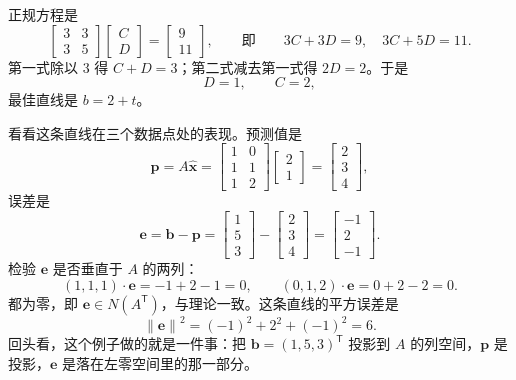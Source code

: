 \documentclass[UTF8,a4paper,12pt]{ctexart}
\numberwithin{equation}{section}
\newcommand{\norm}[1]{\left\lVert #1 \right\rVert}
\newcommand{\trans}{^{\mathsf T}}
\begin{document}
	正规方程是
	\begin{equation}\label{eq:6.67}
	\begin{bmatrix}
		3&3\\
		3&5
	\end{bmatrix}
	\begin{bmatrix}
		C\\
		D
	\end{bmatrix}
	=
	\begin{bmatrix}
		9\\
		11
	\end{bmatrix},
	\qquad
	\text{即}
	\qquad
	3C+3D=9,
	\quad
	3C+5D=11.
	\end{equation}
	第一式除以 $3$ 得 $C+D=3$；第二式减去第一式得 $2D=2$。于是
	\begin{equation}\label{eq:6.68}
	D=1,
	\qquad
	C=2,
	\end{equation}
	最佳直线是 $b=2+t$。

	看看这条直线在三个数据点处的表现。预测值是
	\begin{equation}\label{eq:6.69}
	\bm{p}=A\hat{\bm{x}}
	=
	\begin{bmatrix}
		1&0\\
		1&1\\
		1&2
	\end{bmatrix}
	\begin{bmatrix}
		2\\
		1
	\end{bmatrix}
	=
	\begin{bmatrix}
		2\\
		3\\
		4
	\end{bmatrix},
	\end{equation}
	误差是
	\begin{equation}\label{eq:6.70}
	\bm{e}=\bm{b}-\bm{p}
	=
	\begin{bmatrix}
		1\\
		5\\
		3
	\end{bmatrix}
	-
	\begin{bmatrix}
		2\\
		3\\
		4
	\end{bmatrix}
	=
	\begin{bmatrix}
		-1\\
		2\\
		-1
	\end{bmatrix}.
	\end{equation}
	检验 $\bm{e}$ 是否垂直于 $A$ 的两列：
	\begin{equation}\label{eq:6.71}
	(1,1,1)\cdot\bm{e}=-1+2-1=0,
	\qquad
	(0,1,2)\cdot\bm{e}=0+2-2=0.
	\end{equation}
	都为零，即 $\bm{e}\in N(A\trans)$，与理论一致。这条直线的平方误差是
	\begin{equation}\label{eq:6.72}
	\norm{\bm{e}}^2=(-1)^2+2^2+(-1)^2=6.
	\end{equation}
	回头看，这个例子做的就是一件事：把 $\bm{b}=(1,5,3)\trans$ 投影到 $A$ 的列空间，$\bm{p}$ 是投影，$\bm{e}$ 是落在左零空间里的那一部分。
\end{document}
